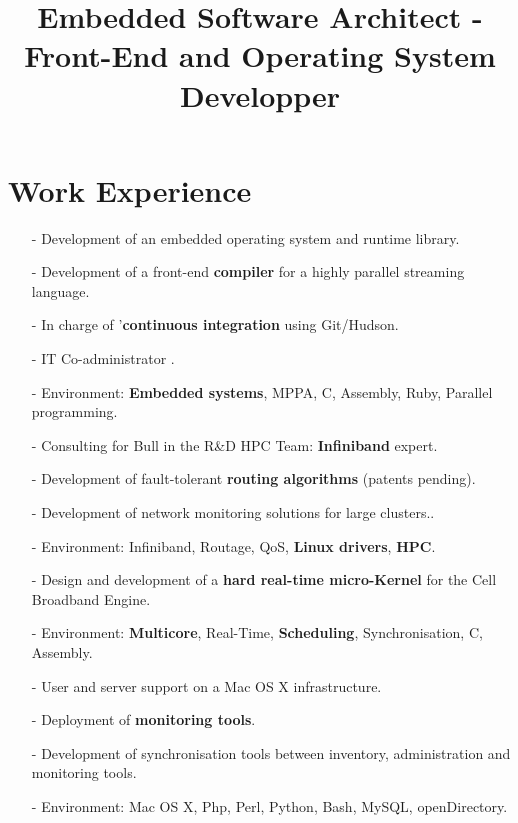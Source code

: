 \documentclass[10pt,a4paper]{moderncv}
\title{Embedded Software Architect - Front-End and Operating System Developper}
\begin{document}
\maketitle
\section{Work Experience}
{
\begin{itemize}
\item[-]{Development of an embedded operating system and runtime library.}
\item[-]{Development of a front-end \textbf{compiler} for a highly parallel streaming language.}
\item[-]{In charge of '\textbf{continuous integration} using Git/Hudson.}
\item[-]{IT Co-administrator .}
\item[-]{Environment: \textbf{Embedded systems}, MPPA, C, Assembly, Ruby, Parallel programming.}
\end{itemize}
}

{
\begin{itemize}
\item[-]{Consulting for Bull in the R\&D HPC Team: \textbf{Infiniband} expert.}
\item[-]{Development of fault-tolerant \textbf{routing algorithms} (patents pending).}
\item[-]{Development of network monitoring solutions for large clusters..}
\item[-]{Environment: Infiniband, Routage, QoS, \textbf{Linux drivers}, \textbf{HPC}.}
\end{itemize}
}

{
\begin{itemize}
\item[-]{Design and development of a \textbf{hard real-time micro-Kernel} for the Cell Broadband Engine.}
\item[-]{Environment: \textbf{Multicore}, Real-Time, \textbf{Scheduling}, Synchronisation, C, Assembly.}
\end{itemize}
}

{
\begin{itemize}
\item[-]{User and server support on a Mac OS X infrastructure.}
\item[-]{Deployment of \textbf{monitoring tools}.}
\item[-]{Development of synchronisation tools between inventory, administration and monitoring tools.}
\item[-]{Environment: Mac OS X, Php, Perl, Python, Bash, MySQL, openDirectory.}
\end{itemize}
}
\end{document}
